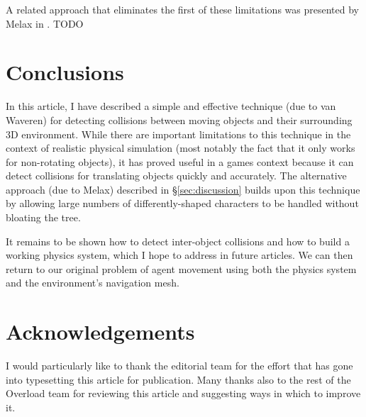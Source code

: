 \documentclass[10pt,twocolumn]{article}
\begin{document}
A related approach that eliminates the first of these limitations was presented by Melax in \cite{melax00}. TODO

\section{Conclusions}
\label{sec:conclusions}

In this article, I have described a simple and effective technique (due to van Waveren) for detecting collisions between moving objects and their surrounding 3D environment. While there are important limitations to this technique in the context of realistic physical simulation (most notably the fact that it only works for non-rotating objects), it has proved useful in a games context because it can detect collisions for translating objects quickly and accurately. The alternative approach (due to Melax) described in \S\ref{sec:discussion} builds upon this technique by allowing large numbers of differently-shaped characters to be handled without bloating the tree.

It remains to be shown how to detect inter-object collisions and how to build a working physics system, which I hope to address in future articles. We can then return to our original problem of agent movement using both the physics system and the environment's navigation mesh.

\section{Acknowledgements}

I would particularly like to thank the editorial team for the effort that has gone into typesetting this article for publication. Many thanks also to the rest of the Overload team for reviewing this article and suggesting ways in which to improve it.

%
%

\clearpage




\end{document}
